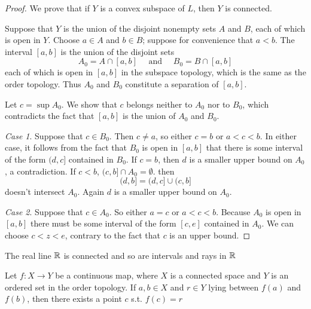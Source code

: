 \documentclass[11pt]{article}
\begin{document}
\begin{proof}
We prove that if \(Y\) is a convex subspace of \(L\), then \(Y\) is connected.

Suppose that \(Y\) is the union of the disjoint nonempty sets \(A\) and \(B\), each of which is
open in \(Y\). Choose \(a\in A\) and \(b\in  B\); suppose for convenience that \(a<b\). The
interval \([a,b]\) is the union of the disjoint sets
\begin{equation*}
A_0=A\cap[a,b] \quad\text{ and }\quad B_0=B\cap[a,b]
\end{equation*}
each of which is open in \([a,b]\) in the subspace topology, which is the same as the order
topology. Thus \(A_0\) and \(B_0\) constitute a separation of \([a,b]\).

Let \(c=\sup A_0\). We show that \(c\) belongs neither to \(A_0\) nor to \(B_0\), which
contradicts the fact that \([a,b]\) is the union of \(A_0\) and \(B_0\).

\emph{Case 1}. Suppose that \(c\in B_0\). Then \(c\neq a\), so either \(c=b\) or \(a<c<b\). In either case,
it follows from the fact that \(B_0\) is open in \([a,b]\) that there is some interval of the
form \((d,c]\) contained in \(B_0\). If \(c=b\), then \(d\) is a smaller upper bound on \(A_0\),
a contradiction. If \(c<b\), \((c,b]\cap A_0=\emptyset\). then
\begin{equation*}
(d,b]=(d,c]\cup(c,b]
\end{equation*}
doesn't intersect \(A_0\). Again \(d\) is a smaller upper bound on \(A_0\).

\emph{Case 2}. Suppose that \(c\in A_0\). So either \(a=c\) or \(a<c<b\). Because \(A_0\) is open
in \([a,b]\) there must be some interval of the form \([c,e]\) contained in \(A_0\). We can
choose \(c<z<e\), contrary to the fact that \(c\) is an upper bound.
\end{proof}

\begin{corollary}[]
The real line \(\mathbb{R}\) is connected and so are intervals and rays in \(\mathbb{R}\)
\end{corollary}

\begin{theorem}
Let \(f:X\to Y\) be a continuous map, where \(X\) is a connected space and \(Y\) is an ordered set
in the order topology. If \(a,b\in X\) and \(r\in Y\) lying between \(f(a)\) and \(f(b)\), then there
exists a point \(c\) s.t. \(f(c)=r\)
\end{theorem}
\end{document}
